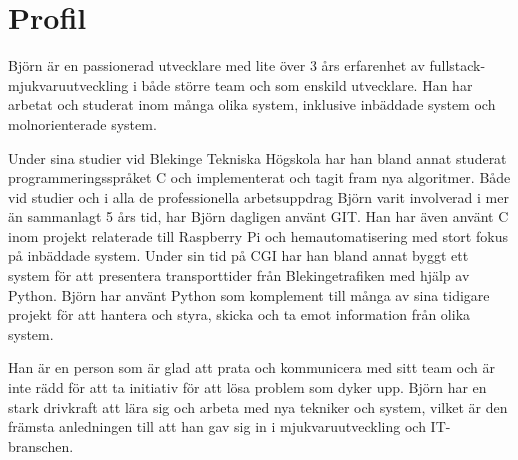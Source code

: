 \documentclass{article}
\begin{document}
\noindent
\begin{minipage}[t]{0.7\textwidth}
\vspace{-20pt} %
\section*{\textcolor{colorBlue}{Profil}}
Björn är en passionerad utvecklare med lite över 3 års erfarenhet av fullstack-mjukvaruutveckling 
i både större team och som enskild utvecklare. Han har arbetat och studerat inom många olika system, 
inklusive inbäddade system och molnorienterade system.

\vspace{10pt}
Under sina studier vid Blekinge Tekniska Högskola har han bland annat studerat programmeringsspråket C 
och implementerat och tagit fram nya algoritmer. Både vid studier och i alla de professionella arbetsuppdrag 
Björn varit involverad i mer än sammanlagt 5 års tid, har Björn dagligen använt GIT. Han har även använt C 
inom projekt relaterade till Raspberry Pi och hemautomatisering med stort fokus på inbäddade system. 
Under sin tid på CGI har han bland annat byggt ett system för att presentera transporttider från 
Blekingetrafiken med hjälp av Python. Björn har använt Python som komplement till många av sina 
tidigare projekt för att hantera och styra, skicka och ta emot information från olika system.

\vspace{10pt}
Han är en person som är glad att prata och kommunicera med sitt team och är inte rädd för att ta 
initiativ för att lösa problem som dyker upp. Björn har en stark drivkraft att lära sig och arbeta 
med nya tekniker och system, vilket är den främsta anledningen till att han gav sig in i 
mjukvaruutveckling och IT-branschen.

\end{minipage}%
\hfill
\end{document}
